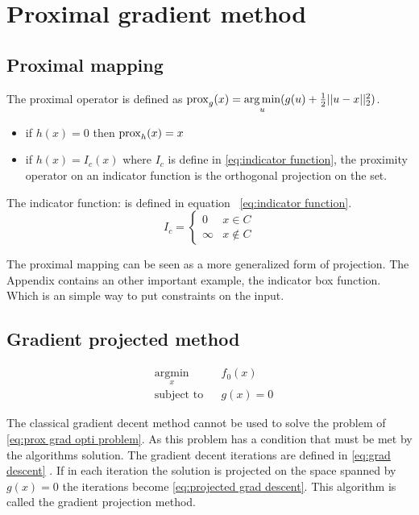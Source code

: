 \section{Proximal gradient method}
	\subsection{Proximal mapping}
		The proximal operator is defined as $\operatorname{prox}_g(x)= \underset{u}{\operatorname*{arg\,min}}(g(u) + \frac{1}{2}||u-x||^2_2)$. 
		
		\begin{itemize}
			\item if $h(x)=0$ then $\operatorname{prox}_h(x)=x$ 
			\item if $h(x)=I_c(x)$ where $I_c$ is define in \eqref{eq:indicator function}, the proximity operator on an indicator function is the orthogonal projection on the set.
		\end{itemize}
		
		The indicator function: is defined in equation ~\eqref{eq:indicator function}.
		\begin{equation}
			I_c = 
			\begin{cases}
			0 & x \in C  \\
			\infty & x \notin C
			\end{cases}
			\label{eq:indicator function}
		\end{equation}
		
	The proximal mapping can be seen as a more generalized form of projection. The Appendix contains an other important example, the indicator box function. Which is an simple way to put constraints on the input.
	
	\subsection{Gradient projected method}
		
		\begin{equation}
			\begin{aligned}
			& \underset{x}{\text{argmin}}
			& & f_0(x) \\
			& \text{subject to}
			& & g(x)=0
			\end{aligned}
			\label{eq:prox grad opti problem}
		\end{equation}
		
		The classical gradient decent method cannot be used to solve the problem of \eqref{eq:prox grad opti problem}. As this problem has a condition that must be met by the algorithms solution. The gradient decent iterations are defined in \eqref{eq:grad descent} . If in each iteration the solution is projected on the space spanned by $g(x)=0$ the iterations become \eqref{eq:projected grad descent}. This algorithm is called the gradient projection method.
		
